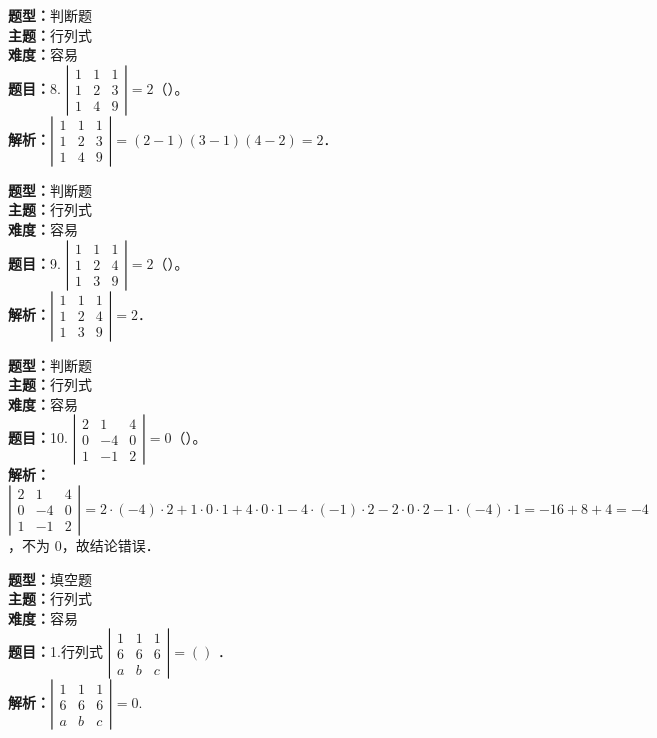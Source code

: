 \documentclass{ctexart}
\newenvironment{question}[5]{%
	\noindent\textbf{题型：}#1\\
	\textbf{主题：}#2\\
	\textbf{难度：}#3\\
	\textbf{题目：}#4\\
	\textbf{解析：}#5\\
	\vspace{1em}
}{}
\begin{document}
\begin{question}
	{判断题}
	{行列式}
	{容易}
	{8. $\left|\begin{array}{lll}1 & 1 & 1 \\ 1 & 2 & 3 \\ 1 & 4 & 9\end{array}\right|=2$（）。}
	{$\left|\begin{array}{lll}1 & 1 & 1 \\ 1 & 2 & 3 \\ 1 & 4 & 9\end{array}\right| = (2-1)(3-1)(4-2) = 2$．}
\end{question}

\begin{question}
	{判断题}
	{行列式}
	{容易}
	{9. $\left|\begin{array}{lll}1 & 1 & 1 \\ 1 & 2 & 4 \\ 1 & 3 & 9\end{array}\right|=2$（）。}
	{$\left|\begin{array}{lll}1 & 1 & 1 \\ 1 & 2 & 4 \\ 1 & 3 & 9\end{array}\right| = 2$．}
\end{question}

\begin{question}
	{判断题}
	{行列式}
	{容易}
	{10. $\left|\begin{array}{ccc}2 & 1 & 4 \\ 0 & -4 & 0 \\ 1 & -1 & 2\end{array}\right|=0$（）。}
	{$\left|\begin{array}{ccc}2 & 1 & 4 \\ 0 & -4 & 0 \\ 1 & -1 & 2\end{array}\right| = 2 \cdot (-4) \cdot 2 + 1 \cdot 0 \cdot 1 + 4 \cdot 0 \cdot 1 - 4 \cdot (-1) \cdot 2 - 2 \cdot 0 \cdot 2 - 1 \cdot (-4) \cdot 1 = -16 + 8 + 4 = -4$，不为 0，故结论错误．}
\end{question}
\newpage
\begin{question}
	{填空题}
	{行列式}
	{容易}
	{1.行列式 $\left|\begin{array}{lll}1 & 1 & 1 \\ 6 & 6 & 6 \\ a & b & c\end{array}\right|=()$ ．}
	{$\left|\begin{array}{lll}1 & 1 & 1 \\ 6 & 6 & 6 \\ a & b & c\end{array}\right|=0$.}
\end{question}
\end{document}
